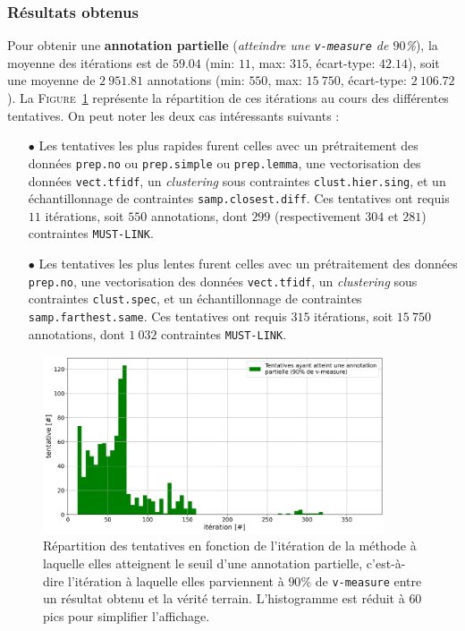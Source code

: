 		\subsubsection{Résultats obtenus}
		
			Pour obtenir une \textbf{annotation partielle} (\textit{atteindre une \texttt{v-measure} de $90$\%}), la moyenne des itérations est de $59.04$ (min: $11$, max: $315$, écart-type: $42.14$), soit une moyenne de $2~951.81$ annotations (min: $550$, max: $15~750$, écart-type: $2~106.72$).
			La \textsc{Figure~\ref{figure:4.2.1-ETUDE-OPTIMISATION-HISTOGRAMME-ANNOTATION-PARTIELLE}} représente la répartition de ces itérations au cours des différentes tentatives.
			On peut noter les deux cas intéressants suivants :
			\begin{itemize}
				\item[$\bullet$] Les tentatives les plus rapides furent celles avec un prétraitement des données \texttt{prep.no} ou \texttt{prep.simple} ou \texttt{prep.lemma}, une vectorisation des données \texttt{vect.tfidf}, un \textit{clustering} sous contraintes \texttt{clust.hier.sing}, et un échantillonnage de contraintes \texttt{samp.closest.diff}. Ces tentatives ont requis $11$ itérations, soit $550$ annotations, dont $299$ (respectivement $304$ et $281$) contraintes \texttt{MUST-LINK}.
				\item[$\bullet$] Les tentatives les plus lentes furent celles avec un prétraitement des données \texttt{prep.no}, une vectorisation des données \texttt{vect.tfidf}, un \textit{clustering} sous contraintes \texttt{clust.spec}, et un échantillonnage de contraintes \texttt{samp.farthest.same}. Ces tentatives ont requis $315$ itérations, soit $15~750$ annotations, dont $1~032$ contraintes \texttt{MUST-LINK}.
			\end{itemize}
			\begin{figure}[!htb]
				\centering
				\includegraphics[width=0.90\textwidth]{figures/etude-efficience-histogramme-annotation-partielle}
				\caption{
					Répartition des tentatives en fonction de l'itération de la méthode à laquelle elles atteignent le seuil d'une annotation partielle, c'est-à-dire l'itération à laquelle elles parviennent à $90$\% de \texttt{v-measure} entre un résultat obtenu et la vérité terrain.
					L'histogramme est réduit à $60$ pics pour simplifier l'affichage.
				}
				\label{figure:4.2.1-ETUDE-OPTIMISATION-HISTOGRAMME-ANNOTATION-PARTIELLE}
			\end{figure}
